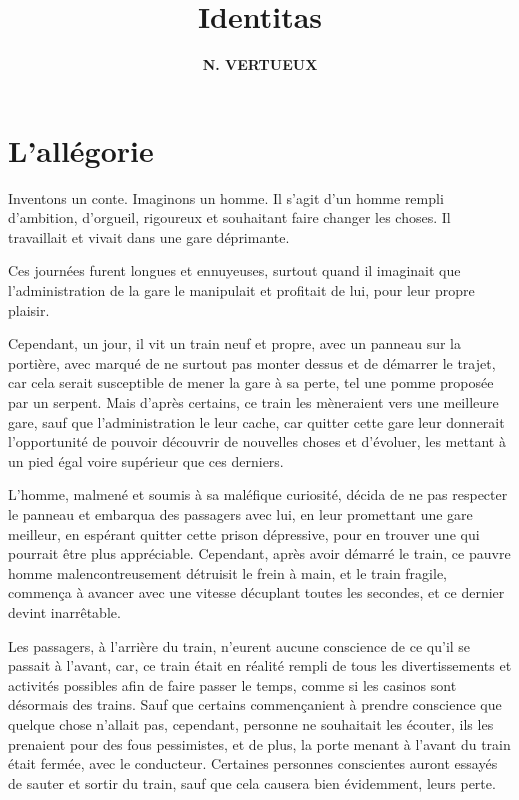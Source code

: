 \documentclass[twocolumn, french]{article}
\author{\large{\textbf{N. VERTUEUX}}}
\title{
  \fontsize{30pt}{36pt}\selectfont \textbf{Identitas}
}
\begin{document}
\maketitle
\section*{L'allégorie} 
Inventons un conte. Imaginons un homme. Il s'agit d'un homme rempli d'ambition, d'orgueil, rigoureux et 
souhaitant faire changer les choses. Il travaillait et vivait dans une gare déprimante. 

Ces journées furent longues et ennuyeuses, surtout quand il imaginait que l'administration de la gare le 
manipulait et profitait de lui, pour leur propre plaisir. 

Cependant, un jour, il vit un train neuf et propre, avec un panneau sur la portière, avec marqué de ne surtout pas 
monter dessus et de démarrer le trajet, car cela serait susceptible de mener la gare à sa perte, tel une pomme 
proposée par un serpent. Mais d'après certains, ce train les mèneraient vers une meilleure gare, sauf que 
l'administration le leur cache, car quitter cette gare leur donnerait l'opportunité de pouvoir découvrir de nouvelles 
choses et d'évoluer, les mettant à un pied égal voire supérieur que ces derniers.   

L'homme, malmené et soumis à sa maléfique curiosité, décida de ne pas respecter le panneau 
et embarqua des passagers avec lui, en leur promettant une gare meilleur, en espérant quitter 
cette prison dépressive, pour en trouver une qui pourrait être plus appréciable. Cependant, après 
avoir démarré le train, ce pauvre homme malencontreusement détruisit le frein à main, et le train fragile, 
commença à avancer avec une vitesse décuplant toutes les secondes, et ce dernier devint inarrêtable. 

Les passagers, à l'arrière du train, n'eurent aucune conscience de ce qu'il se passait à l'avant, car,
ce train était en réalité rempli de tous les divertissements et activités possibles afin de faire passer le temps, 
comme si les casinos sont désormais des trains.
Sauf que certains commençanient à prendre conscience que quelque chose n'allait pas, cependant, personne ne 
souhaitait les écouter, ils les prenaient pour des fous pessimistes, et de plus, la porte menant à l'avant du train 
était fermée, avec le conducteur. Certaines personnes conscientes auront essayés de sauter et sortir du train, sauf 
que cela causera bien évidemment, leurs perte.
\end{document}
